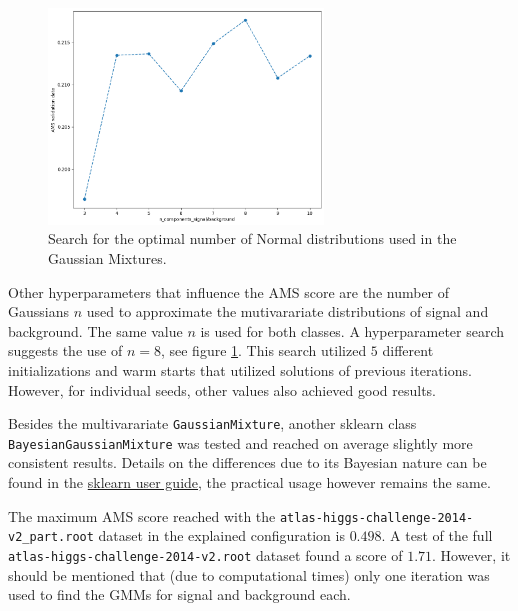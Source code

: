 \begin{figure}
    \centering
    \includegraphics[width=0.65\textwidth]{img/Pasted image 20240805120618.png}
    \caption{Search for the optimal number of Normal distributions used in the Gaussian Mixtures.}
    \label{fig:n-search}
\end{figure}


Other hyperparameters that influence the AMS score are the number of Gaussians $n$ used to approximate the mutivarariate distributions of signal and background. The same value $n$ is used for both classes. A hyperparameter search suggests the use of $n=8$, see figure \ref{fig:n-search}. This search utilized $5$ different initializations and warm starts that utilized solutions of previous iterations. However, for individual seeds, other values also achieved good results. 



Besides the multivarariate \texttt{GaussianMixture}, another sklearn class \texttt{BayesianGaussianMixture} was tested and reached on average slightly more consistent results. Details on the differences due to its Bayesian nature can be found in the  \href{https://scikit-learn.org/stable/modules/mixture.html#variational-bayesian-gaussian-mixture}{sklearn user guide}, the practical usage however remains the same. 

The maximum AMS score reached with the \texttt{atlas-higgs-challenge-2014-v2\_part.root} dataset in the explained configuration is $0.498$. 
A test of the full \texttt{atlas-higgs-challenge-2014-v2.root} dataset found a score of $1.71$. However, it should be mentioned that (due to computational times) only one iteration was used to find the GMMs for signal and background each. 


